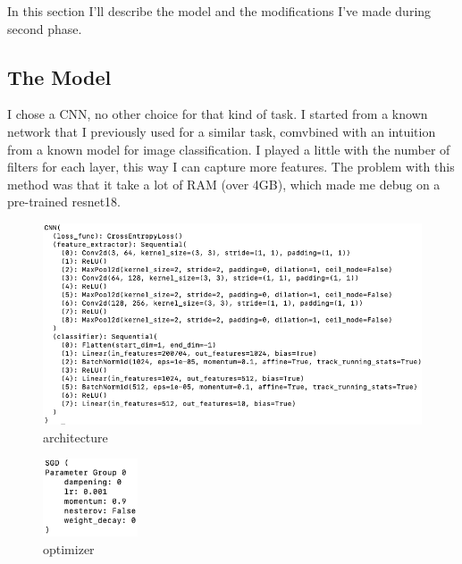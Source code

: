 In this section I'll describe the model and the modifications I've made during second phase.
\subsection{The Model}
I chose a CNN, no other choice for that kind of task.
I started from a known network that I previously used for a similar task, comvbined with an intuition from a known model
for image classification.
I played a little with the number of filters for each layer, this way I can capture more features.
The problem with this method was that it take a lot of RAM (over 4GB), which made me debug on a pre-trained resnet18.
\begin{figure}[H]
    \centering
     \includegraphics[scale=0.5]{images/architecture}
    \caption{architecture}
    \label{fig:architecture}
\end{figure}

\begin{figure}[H]
    \centering
    \includegraphics[width=0.25\textwidth]{images/optimizer}
    \caption{optimizer}
    \label{fig:optimizer}
\end{figure}

